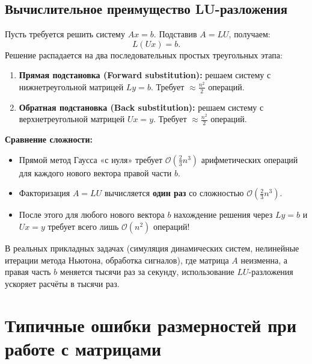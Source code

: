 \subsection{Вычислительное преимущество LU-разложения}
Пусть требуется решить систему $Ax = b$.
Подставив $A = LU$, получаем:
\[ L (U x) = b. \]
Решение распадается на два последовательных простых треугольных этапа:
\begin{enumerate}
    \item \textbf{Прямая подстановка (Forward substitution):} решаем систему с нижнетреугольной матрицей $L y = b$.
    Требует $\approx \frac{n^2}{2}$ операций.
    \item \textbf{Обратная подстановка (Back substitution):} решаем систему с верхнетреугольной матрицей $U x = y$.
    Требует $\approx \frac{n^2}{2}$ операций.
\end{enumerate}

\textbf{Сравнение сложности:}
\begin{itemize}
    \item Прямой метод Гаусса «с нуля» требует $\mathcal{O}\left(\frac{2}{3} n^3\right)$ арифметических операций
    для каждого нового вектора правой части $b$.
    \item Факторизация $A=LU$ вычисляется \textbf{один раз} со сложностью $\mathcal{O}\left(\frac{2}{3} n^3\right)$.
    \item После этого для любого нового вектора $b$ нахождение решения через $Ly = b$ и $Ux = y$ требует всего лишь
    $\mathcal{O}(n^2)$ операций!
\end{itemize}
В реальных прикладных задачах (симуляция динамических систем, нелинейные итерации метода Ньютона, обработка
сигналов), где матрица $A$ неизменна, а правая часть $b$ меняется тысячи раз за секунду, использование
$LU$-разложения ускоряет расчёты в тысячи раз.

\section{Типичные ошибки размерностей при работе с матрицами}

